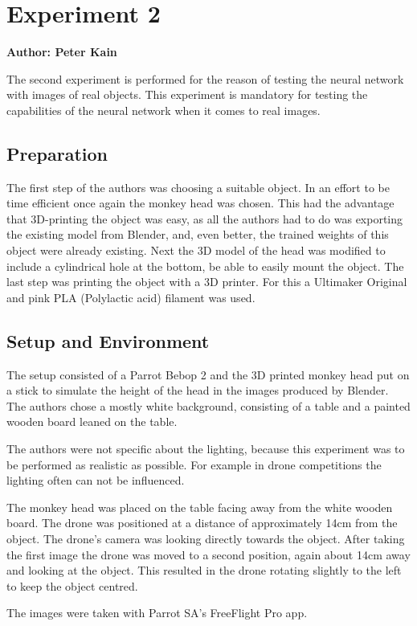 \chapter{Experiment 2}

\textbf{Author: Peter Kain} 

The second experiment is performed for the reason of testing the neural network with images of real objects. This experiment is mandatory for testing the capabilities of the neural network when it comes to real images.

\section{Preparation}
The first step of the authors was choosing a suitable object. In an effort to be time efficient once again the monkey head was chosen. This had the advantage that 3D-printing the object was easy, as all the authors had to do was exporting the existing model from Blender, and, even better, the trained weights of this object were already existing. Next the 3D model of the head was modified to include a cylindrical hole at the bottom, be able to easily mount the object. The last step was printing the object with a 3D printer. For this a Ultimaker Original and pink PLA (Polylactic acid) filament was used.

\section{Setup and Environment}
The setup consisted of a Parrot Bebop 2 and the 3D printed monkey head put on a stick to simulate the height of the head in the images produced by Blender. The authors chose a mostly white background, consisting of a table and a painted wooden board leaned on the table.

The authors were not specific about the lighting, because this experiment was to be performed as realistic as possible. For example in drone competitions the lighting often can not be influenced.

The monkey head was placed on the table facing away from the white wooden board. The drone was positioned at a distance of approximately 14cm from the object. The drone's camera was looking directly towards the object. After taking the first image the drone was moved to a second position, again about 14cm away and looking at the object. This resulted in the drone rotating slightly to the left to keep the object centred.

The images were taken with Parrot SA's FreeFlight Pro app.

